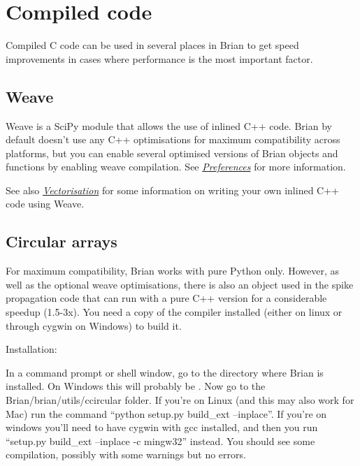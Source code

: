\documentclass[letterpaper,10pt,english]{manual}
\begin{document}
\resetcurrentobjects
\hypertarget{--doc-compiledcode}{}

\hypertarget{compiled-code}{}\section{Compiled code}

Compiled C code can be used in several places in Brian to get speed improvements in cases where performance
is the most important factor.


\subsection{Weave}

Weave is a SciPy module that allows the use of inlined C++ code. Brian by default doesn't use any C++
optimisations for maximum compatibility across platforms, but you can enable several optimised
versions of Brian objects and functions by enabling weave compilation. See \hyperlink{preferences}{\emph{Preferences}}
for more information.

See also \hyperlink{efficiency-vectorisation}{\emph{Vectorisation}} for some information on writing your own inlined C++ code
using Weave.


\subsection{Circular arrays}

For maximum compatibility, Brian works with pure Python only. However, as well as the optional
weave optimisations, there is also an object used in the spike propagation code that can run
with a pure C++ version for a considerable speedup (1.5-3x). You need a copy of the  compiler
installed (either on linux or through cygwin on Windows) to build it.

Installation:

In a command prompt or shell window, go to the directory where Brian is installed. On Windows this
will probably be . Now
go to the Brian/brian/utils/ccircular folder. If you're on Linux (and this may also work for Mac) run
the command ``python setup.py build\_ext --inplace''. If you're on windows you'll need to have cygwin with gcc
installed, and then you run ``setup.py build\_ext --inplace -c mingw32'' instead. You should see some
compilation, possibly with some warnings but no errors.
\end{document}
